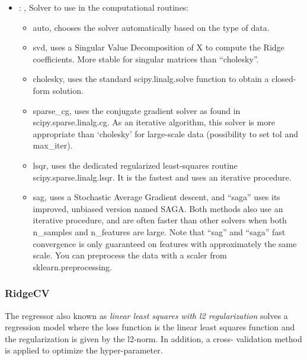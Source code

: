 \begin{itemize}
    \item {}: ,
      Solver to use in the computational routines:
      \begin{itemize}                                                    \item auto, chooses the
      solver automatically based on the type of data.
      \item svd, uses a Singular Value Decomposition of X to compute the Ridge coefficients. More
      stable for singular                                                                matrices
      than ``cholesky''.                                                    \item cholesky, uses the
      standard scipy.linalg.solve function to obtain a closed-form solution.
      \item sparse\_cg, uses the conjugate gradient solver as found in scipy.sparse.linalg.cg. As an
      iterative algorithm,                                                               this solver
      is more appropriate than ‘cholesky’ for large-scale data (possibility to set tol and
      max\_iter).                                                    \item lsqr, uses the dedicated
      regularized least-squares routine scipy.sparse.linalg.lsqr. It is the fastest and uses
      an iterative procedure.                                                    \item sag, uses a
      Stochastic Average Gradient descent, and ``saga'' uses its improved, unbiased version named
      SAGA.                                                               Both methods also use an
      iterative procedure, and are often faster than other solvers when both
      n\_samples and n\_features are large. Note that ``sag'' and ``saga'' fast convergence is only
      guaranteed on                                                               features with
      approximately the same scale. You can preprocess the data with a scaler from
      sklearn.preprocessing.                                                  \end{itemize}
  \end{itemize}


\subsubsection{RidgeCV}
  The  regressor also known as                              \textit{linear least
  squares with l2 regularization} solves a regression                              model where the
  loss function is the linear least squares function and the
  regularization is given by the l2-norm.                              In addition, a cross-
  validation method is applied to optimize the hyper-parameter.

